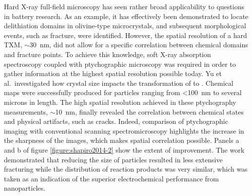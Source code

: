 \documentclass[journal=cmatex,manuscript=perspective]{achemso}
\begin{document}
Hard X-ray full-field microscopy has seen rather broad applicability
to questions in battery research. As an example, it has effectively
been demonstrated to locate delithiation domains in olivine-type
 microcrystals, and subsequent morphological events, such
as fracture, were identified\cite{boesenberg2013}. However, the
spatial resolution of a hard TXM, $\sim$\SI{30}{nm}, did not allow for
a specific correlation between chemical domains and fracture
points. To achieve this knowledge, soft X-ray absorption spectroscopy
coupled with ptychographic microscopy was required in order to gather
information at the highest spatial resolution possible today. Yu et
al.\ investigated how crystal size impacts the transformation of
 to \cite{yu2015-2}. Chemical maps were
successfully produced for particles ranging from <\SI{100}{nm} to
several microns in length. The high spatial resolution achieved in
these ptychography measurements, $\sim$\SI{10}{nm}, finally revealed
the correlation between chemical states and physical artifacts, such
as cracks. Indeed, comparison of ptychographic imaging with
conventional scanning spectromicroscopy highlights the increase in the
sharpness of the images, which makes spatial correlation
possible. Panels a and b of figure \ref{figure:shapiro2014-2} show the
extent of improvement\cite{shapiro2014}. The work demonstrated that
reducing the size of  particles resulted in less extensive
fracturing while the distribution of reaction products was very
similar, which was taken as an indication of the superior
electrochemical performance from 
nanoparticles\cite{yu2015-2}.
\end{document}
